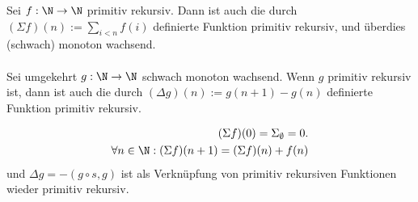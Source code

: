 
\begin{exercise}[196]

Sei $f: \N \to \N$ primitiv rekursiv. Dann ist auch die durch
$(\Sigma f)(n) := \sum_{i < n} f(i)$ definierte Funktion primitiv rekursiv,
und überdies (schwach) monoton wachsend.
\\
\\
Sei umgekehrt $g:\N \to \N$ schwach monoton wachsend. Wenn $g$ primitiv rekursiv ist, dann ist auch die durch $(\Delta g)(n) := g(n + 1) - g(n)$ definierte Funktion primitiv rekursiv.

\end{exercise}


\begin{solution}

	\begin{align*}
	(\Sigma f)(0) = \Sigma_\emptyset = 0. \\
	\forall n \in \N: (\Sigma f)(n + 1) = (\Sigma f)(n) + f(n)
	\end{align*}
	und $\Delta g = -(g\circ s, g)$ ist als Verknüpfung von primitiv rekursiven Funktionen wieder primitiv rekursiv.

\end{solution}
